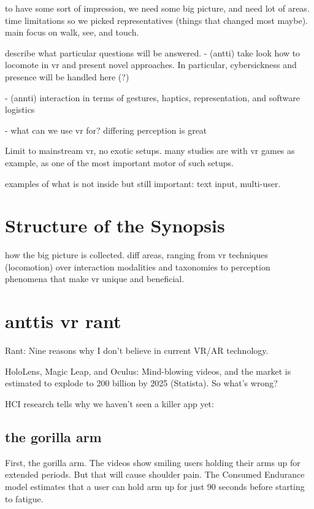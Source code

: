 to have some sort of impression, we need some big picture, and need lot of areas. time limitations so we picked representatives (things that changed most maybe). main focus on walk, see, and touch.

describe what particular questions will be answered.
- (antti) take look how to locomote in vr and present novel approaches. In particular, cybersickness and presence will be handled here (?)


- (annti) interaction in terms of gestures, haptics, representation, and software logistics


- what can we use vr for? differing perception is great


Limit to mainstream vr, no exotic setups.
many studies are with vr games as example, as one of the most important motor of such setups.


examples of what is not inside but still important: text input, multi-user.




\section{Structure of the Synopsis}

how the big picture is collected. diff areas, ranging from vr techniques (locomotion) over interaction modalities and taxonomies to perception phenomena that make vr unique and beneficial.



\section{anttis vr rant}

Rant: Nine reasons why I don't believe in current VR/AR technology.

HoloLens, Magic Leap, and Oculus: Mind-blowing videos, and the market is estimated to explode to 200 billion by 2025 (Statista). So what's wrong?

HCI research tells why we haven't seen a killer app yet:




\subsection{the gorilla arm}

First, the gorilla arm. The videos show smiling users holding their arms up for extended periods. But that will cause shoulder pain. The Consumed Endurance model estimates that a user can hold arm up for just 90 seconds before starting to fatigue. 

